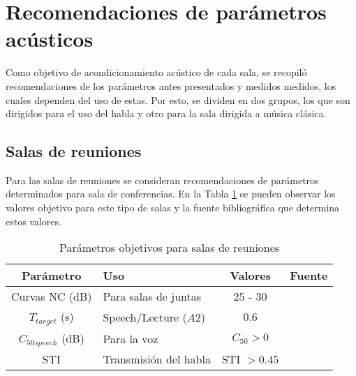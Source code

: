 \section{Recomendaciones de parámetros acústicos} \label{secc: Recomendaciones}
Como objetivo de acondicionamiento acústico de cada sala, se recopiló recomendaciones de los parámetros antes presentados y medidos medidos, los cuales dependen del uso de estas. Por esto, se dividen en dos grupos, los que son dirigidos para el uso del habla y otro para la sala dirigida a música clásica.
\subsection{Salas de reuniones}
Para las salas de reuniones se consideran recomendaciones de parámetros determinados para sala de conferencias. En la Tabla \ref{tab: parametros objetivos sala de reuniones} se pueden observar los valores objetivo para este tipo de salas y la fuente bibliográfica que determina estos valores.
\begin{table}[H]
    \centering
    \begin{tabular}{|c|l|c|l|}
    \hline
    \textbf{Parámetro} & \textbf{Uso }            & \textbf{Valores}    & \textbf{Fuente}  \\ \hline
    Curvas NC (dB)         & Para salas de juntas     & $25$ - $30$         & \cite{Recuero} \\ \hline
    $T_{target}$ (s)       & Speech/Lecture ($A2$)      & $0.6$               & \cite{DIN18041} \\ \hline
    $C_{50speech}$ (dB)           & Para la voz              &  $C_{50}>0$         & \cite{marshall1994}  \\ \hline  
    STI & Transmisión del habla & STI $>0.45$ & \cite{ISO9921}\\ \hline
    \end{tabular}
    \caption{Parámetros objetivos para salas de reuniones}
    \label{tab: parametros objetivos sala de reuniones}
\end{table}
